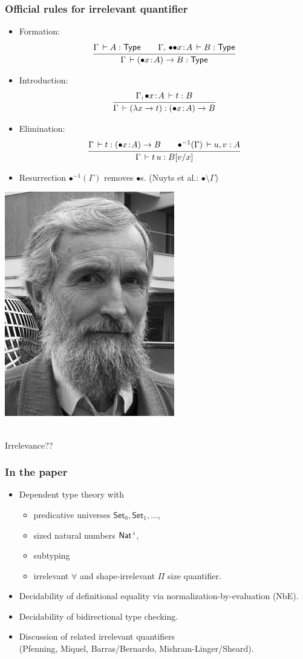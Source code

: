 \documentclass[t,fleqn]{beamer}
\makeatletter
\renewcommand{\ru}[2]{\dfrac{\begin{array}[b]{@{}c@{}} #1 \end{array}}{\begin{array}[t]{@{}l@{}} #2 \end{array}}}
\renewcommand{\Set}{\mathsf{Set}}
\newcommand{\cAnn}{\color{red!80!black}}%
\renewcommand{\emph}[1]{{\cAnn#1}}
\newcommand{\irr}{\mathord{\bullet}}
\newcommand{\shirr}{\mathord{{\bullet}{\bullet}}}
\renewcommand{\erhyp}[3][\irr]{#1#2 \of #3}
\newcommand{\shirrhyp}{\erhyp[\shirr]}
\renewcommand{\erfunT}[4][\irr]{(\erhyp[#1]{#2}{#3}) \to #4}
\renewcommand{\resurrect}[1]{\irr^{-1}(#1)}
\newcommand{\mlsays}[1]{
\begin{frame}%
  \begin{minipage}[c]{0.5\linewidth}
   \includegraphics[height=0.9\textheight]{martin-loef-bw.png}
  \end{minipage}%
  \begin{minipage}[c]{0.5\linewidth}
   \begin{center}
     \bla \\[8ex]
     \Huge #1
   \end{center}
  \end{minipage}
\end{frame}
}
\makeatother
\begin{document}
\begin{frame}%
  \frametitle{Official rules for irrelevant quantifier}
  \begin{itemize}
  \item Formation:
\[
  \ru{\Gamma \der A : \Type \qquad
      \Gamma,\, \shirrhyp x A \der B : \Type
    }{\Gamma \der \erfunT x A B : \Type}
\]
\vspace{-2ex}
  \item Introduction:
\[
  \ru{\Gamma, \erhyp x A \der t : B
    }{\Gamma \der (\lambda x \to t) : \erfunT x A B}
\]
\vspace{-2ex}
  \item Elimination:
\[
  \ru{\Gamma \der t : \erfunT x A B \qquad
      \resurrect \Gamma \der u,v : A
    }{\Gamma \der t\,u : B[v/x]}
\]
\vspace{-2ex}
  \item \emph{Resurrection} $\resurrect \Gamma$ removes $\bullet$s.
  (Nuyts et al.: $\bullet \setminus \Gamma$)
  \end{itemize}
\end{frame}


\mlsays{Irrelevance??}


\begin{frame}%
  \frametitle{In the paper}
  \begin{itemize}
  \item Dependent type theory with
    \begin{itemize}
    \item predicative universes $\Set_0, \Set_1, \dots$,
    \item sized natural numbers $\mathsf{Nat}\,^i$,
    \item subtyping
    \item irrelevant $\forall$ and shape-irrelevant $\Pi$ size quantifier.
    \end{itemize}
  \item Decidability of definitional equality via
    normalization-by-evaluation (NbE).
  \item Decidability of bidirectional type checking.
  \item Discussion of related irrelevant quantifiers \\
    (Pfenning, Miquel, Barras/Bernardo, Mishram-Linger/Sheard).
  \end{itemize}
\end{frame}
\end{document}
